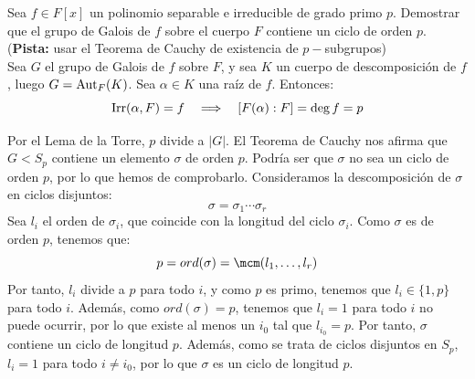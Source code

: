 \begin{ejercicio}
    Sea $f\in F[x]$ un polinomio separable e irreducible de grado primo $p$. Demostrar que el grupo de Galois de $f$ sobre el cuerpo $F$ contiene un ciclo de orden $p$.\newline
    (\textbf{Pista:} usar el Teorema de Cauchy de existencia de $p-$subgrupos)\\

    Sea $G$ el grupo de Galois de $f$ sobre $F$, y sea $K$ un cuerpo de descomposición de $f$, luego $G=\operatorname{Aut}_F(K)$. Sea $\alpha\in K$ una raíz de $f$. Entonces:
    \begin{equation*}
        \operatorname{Irr}(\alpha,F) = f \quad\Longrightarrow\quad [F(\alpha):F] = \deg f = p
    \end{equation*}

    Por el Lema de la Torre, $p$ divide a $|G|$. El Teorema de Cauchy nos afirma que $G<S_p$ contiene un elemento $\sigma$ de orden $p$. Podría ser que $\sigma$ no sea un ciclo de orden $p$, por lo que hemos de comprobarlo. Consideramos la descomposición de $\sigma$ en ciclos disjuntos:
    \begin{equation*}
        \sigma = \sigma_1\cdots\sigma_r
    \end{equation*}
    Sea $l_i$ el orden de $\sigma_i$, que coincide con la longitud del ciclo $\sigma_i$. Como $\sigma$ es de orden $p$, tenemos que:
    \begin{equation*}
        p = ord(\sigma) = \mcm(l_1,\ldots,l_r)
    \end{equation*}
    Por tanto, $l_i$ divide a $p$ para todo $i$, y como $p$ es primo, tenemos que $l_i\in \{1,p\}$ para todo $i$. Además, como $ord(\sigma) = p$, tenemos que $l_i = 1$ para todo $i$ no puede ocurrir, por lo que existe al menos un $i_0$ tal que $l_{i_0} = p$. Por tanto, $\sigma$ contiene un ciclo de longitud $p$. Además, como se trata de ciclos disjuntos en $S_p$, $l_i=1$ para todo $i\neq i_0$, por lo que $\sigma$ es un ciclo de longitud $p$.
\end{ejercicio}

